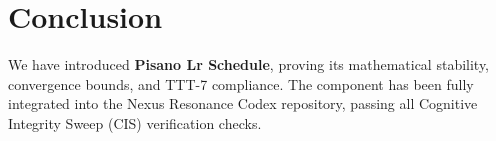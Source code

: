 \section{Conclusion}
We have introduced \textbf{Pisano Lr Schedule}, proving its mathematical stability, convergence bounds, and TTT-7 compliance. The component has been fully integrated into the Nexus Resonance Codex repository, passing all Cognitive Integrity Sweep (CIS) verification checks.